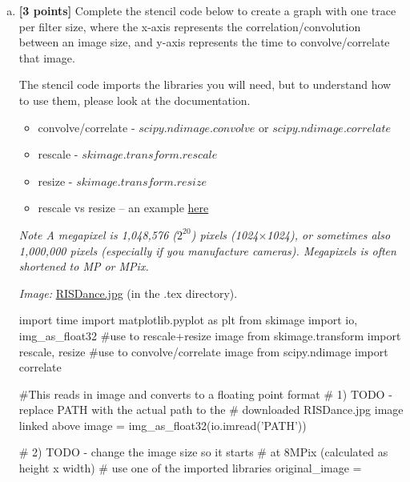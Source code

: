 \begin{enumerate}[(a)]
\item
    \textbf{[3 points]}
    Complete the stencil code below to create a graph with one trace per filter size, where the x-axis represents the correlation/convolution between an image size, and y-axis represents the time to convolve/correlate that image.

    The stencil code imports the libraries you will need, but to understand how to use them, please look at the documentation.
    \begin{itemize}
    \item convolve/correlate - \href{https://docs.scipy.org/doc/scipy/reference/generated/scipy.ndimage.convolve.html}{$scipy.ndimage.convolve$} or \href{https://docs.scipy.org/doc/scipy/reference/generated/scipy.ndimage.correlate.html}{$scipy.ndimage.correlate$}
    \item rescale - \href{https://scikit-image.org/docs/dev/api/skimage.transform.html#skimage.transform.rescale}{$skimage.transform.rescale$}
    \item resize - \href{https://scikit-image.org/docs/dev/api/skimage.transform.html#skimage.transform.resize}{$skimage.transform.resize$}
    \item rescale vs resize – an example \href{http://scikit-image.org/docs/dev/auto_examples/transform/plot_rescale.html}{here}
    \end{itemize}

\emph{Note A megapixel is 1,048,576 ($2^{20}$) pixels (1024$\times$1024), or sometimes also 1,000,000 pixels (especially if you manufacture cameras). Megapixels is often shortened to MP or MPix.}

\emph{Image:} \href{RISDance.jpg}{RISDance.jpg} (in the .tex directory).

\begin{python}
import time
import matplotlib.pyplot as plt
from skimage import io, img_as_float32
#use to rescale+resize image
from skimage.transform import rescale, resize
#use to convolve/correlate image
from scipy.ndimage import correlate

#This reads in image and converts to a floating point format
# 1) TODO - replace PATH with the actual path to the
#    downloaded RISDance.jpg image linked above
image = img_as_float32(io.imread('PATH'))

# 2) TODO - change the image size so it starts
#    at 8MPix (calculated as height x width)
#    use one of the imported libraries
original_image =


\end{python}
\end{enumerate}
